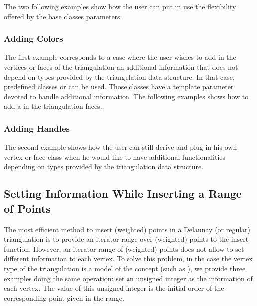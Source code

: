 The two following examples show how the user
can  put in use the flexibility offered by the
base classes parameters.

\subsubsection*{Adding Colors} 

The first example corresponds to a case where the user wishes to add in 
the vertices or faces of the triangulation  an additional information
that does not depend on types provided
by the triangulation data structure. 
In that case, predefined classes
or 
can be used. Those classes have
a template parameter  devoted to
handle additional information.
The following examples shows how to add a 
 in the triangulation faces.



\subsubsection*{Adding Handles}

The second example  shows how the user can  still
derive and plug in his own vertex 
or face class when he would like to have  
additional functionalities depending on types provided by the triangulation
data structure. 



\subsection{Setting Information While Inserting a Range of Points}
The most efficient method to insert (weighted) points in a
Delaunay (or regular) triangulation is to provide an iterator
range over (weighted) points to the insert function. However, an iterator range of
(weighted) points does not allow to set different information to each vertex.
To solve this problem, in the case the vertex type  of the triangulation 
is a model of the concept 
(such as ), we provide three examples 
doing the same operation: set an unsigned integer as the information 
of each vertex. The value of this unsigned integer is the initial order
of the corresponding point given in the range.

